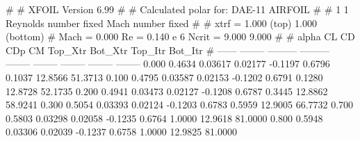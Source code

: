 #  
#       XFOIL         Version 6.99
#  
# Calculated polar for: DAE-11 AIRFOIL                                  
#  
# 1 1 Reynolds number fixed          Mach number fixed         
#  
# xtrf =   1.000 (top)        1.000 (bottom)  
# Mach =   0.000     Re =     0.140 e 6     Ncrit =   9.000  9.000
#  
#   alpha    CL        CD       CDp       CM     Top_Xtr  Bot_Xtr  Top_Itr  Bot_Itr
#  ------ -------- --------- --------- -------- -------- -------- -------- --------
   0.000   0.4634   0.03617   0.02177  -0.1197   0.6796   0.1037  12.8566  51.3713
   0.100   0.4795   0.03587   0.02153  -0.1202   0.6791   0.1280  12.8728  52.1735
   0.200   0.4941   0.03473   0.02127  -0.1208   0.6787   0.3445  12.8862  58.9241
   0.300   0.5054   0.03393   0.02124  -0.1203   0.6783   0.5959  12.9005  66.7732
   0.700   0.5803   0.03298   0.02058  -0.1235   0.6764   1.0000  12.9618  81.0000
   0.800   0.5948   0.03306   0.02039  -0.1237   0.6758   1.0000  12.9825  81.0000
